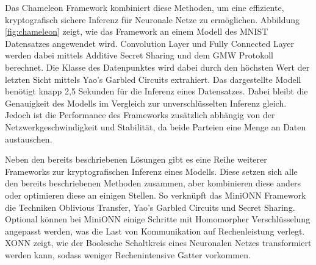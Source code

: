 Das Chameleon Framework kombiniert diese Methoden, um eine effiziente, kryptografisch sichere Inferenz für Neuronale Netze zu ermöglichen. Abbildung \ref{fig:chameleon} zeigt, wie das Framework an einem Modell des MNIST Datensatzes \cite{D-MNIST} angewendet wird.
Convolution Layer und Fully Connected Layer werden dabei mittels Additive Secret Sharing und dem GMW Protokoll berechnet.
Die Klasse des Datenpunktes wird dabei durch den höchsten Wert der letzten Sicht mittels Yao's Garbled Circuits extrahiert.
Das dargestellte Modell benötigt knapp 2,5 Sekunden für die Inferenz eines Datensatzes.
Dabei bleibt die Genauigkeit des Modells im Vergleich zur unverschlüsselten Inferenz gleich.
Jedoch ist die Performance des Frameworks zusätzlich abhängig von der Netzwerkgeschwindigkeit und Stabilität, da beide Parteien eine Menge an Daten austauschen.

Neben den bereits beschriebenen Lösungen gibt es eine Reihe weiterer Frameworks zur kryptografischen Inferenz eines Modells. 
Diese setzen sich alle den bereits beschriebenen Methoden zusammen, aber kombinieren diese anders oder optimieren diese an einigen Stellen.
So verknüpft das MiniONN Framework \cite{P-59} die Techniken Oblivious Transfer, Yao's Garbled Circuits und Secret Sharing. 
Optional können bei MiniONN einige Schritte mit Homomorpher Verschlüsselung angepasst werden, was die Last von Kommunikation auf Rechenleistung verlegt.
XONN \cite{P-106} zeigt, wie der Boolesche Schaltkreis eines Neuronalen Netzes transformiert werden kann, sodass weniger Rechenintensive Gatter vorkommen.
